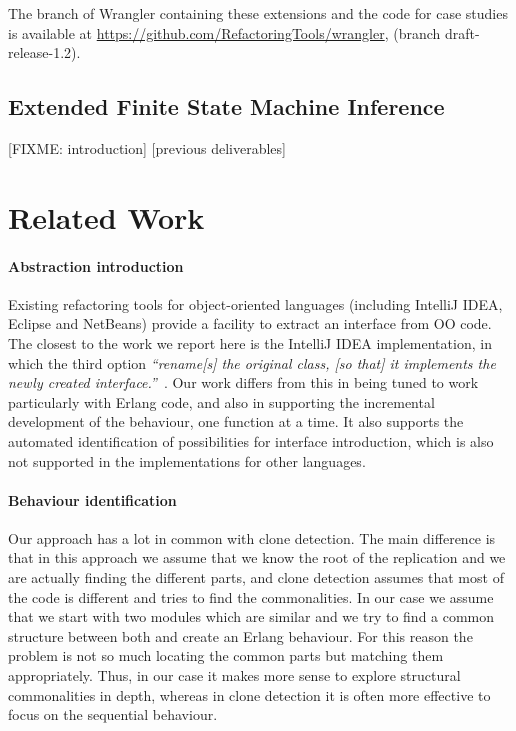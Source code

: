 The branch of Wrangler containing these extensions and the code for case studies is available at 
\url{https://github.com/RefactoringTools/wrangler}, (branch draft-release-1.2).

\subsection{Extended Finite State Machine Inference}

[FIXME: introduction]
[previous deliverables]

\section{Related Work}
\label{related_work}
\label{sec:related_work}

\paragraph{Abstraction introduction}

Existing refactoring tools for object-oriented languages (including IntelliJ IDEA, Eclipse and NetBeans) provide 
a facility to extract an interface from OO code. The closest to the work we report here is the IntelliJ IDEA 
implementation, 
in which the third option \emph{``rename[s] the original class, [so that] it implements the newly created 
interface.''}~\cite{intellij-extract}. Our work differs from this in being tuned to work particularly with Erlang code, 
and also in supporting the incremental development of the behaviour, one function at a time. It also supports the 
automated identification of possibilities for interface introduction, which is also not supported in the implementations 
for other languages.

\paragraph{Behaviour identification}

Our approach has a lot in common with clone detection. The main difference
is that in this approach we assume that we know the root of the replication
and we are actually finding the different parts, and clone detection
assumes that most of the code is different and tries to find the commonalities.
In our case we assume that we start with two modules which are similar
and we try to find a common structure between both and create an Erlang
behaviour. For this reason the problem is not so much locating the
common parts but matching them appropriately. Thus, in our case it
makes more sense to explore structural commonalities in depth, whereas
in clone detection it is often more effective to focus on the sequential
behaviour.


